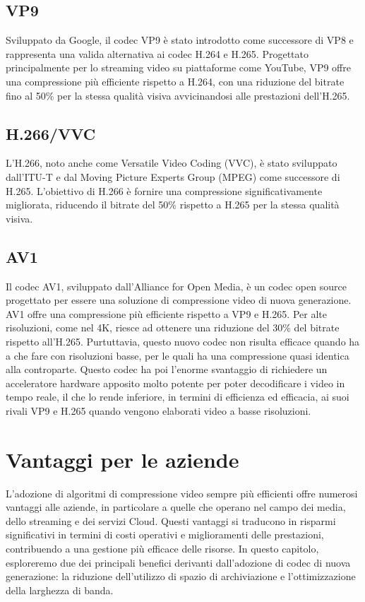 \documentclass[a4paper,12pt, oneside]{article}
\begin{document}
\subsection{VP9}
Sviluppato da Google, il codec VP9 è stato introdotto come successore di VP8 e rappresenta una valida
alternativa ai codec H.264 e H.265. Progettato principalmente per lo streaming video su piattaforme come
YouTube, VP9 offre una compressione più efficiente rispetto a H.264, con una riduzione del bitrate fino al
50\% per la stessa qualità visiva avvicinandosi alle prestazioni dell'H.265.

\subsection{H.266/VVC}
L'H.266, noto anche come Versatile Video Coding (VVC), è stato sviluppato dall'ITU-T e dal Moving Picture
Experts Group (MPEG) come successore di H.265. L'obiettivo di H.266 è fornire una compressione
significativamente migliorata, riducendo il bitrate del 50\% rispetto a H.265 per la stessa qualità visiva.

\subsection{AV1}
Il codec AV1, sviluppato dall'Alliance for Open Media, è un codec open source progettato per essere una
soluzione di compressione video di nuova generazione. AV1 offre una compressione più efficiente rispetto
a VP9 e H.265. Per alte risoluzioni, come nel 4K, riesce ad ottenere una riduzione del 30\% del bitrate
rispetto all'H.265. Purtuttavia, questo nuovo codec non risulta efficace  quando ha a che fare con risoluzioni basse, per le quali ha una compressione quasi identica
alla controparte. Questo codec ha poi l'enorme svantaggio di richiedere un acceleratore hardware apposito
molto potente per poter decodificare i video in tempo reale, il che lo rende inferiore, in termini di efficienza ed efficacia, ai suoi rivali VP9
e H.265 quando vengono elaborati video a basse risoluzioni.

\section{Vantaggi per le aziende}
L'adozione di algoritmi di compressione video sempre più efficienti offre numerosi vantaggi alle aziende,
in particolare a quelle che operano nel campo dei media, dello streaming e dei servizi Cloud. Questi
vantaggi si traducono in risparmi significativi in termini di costi operativi e miglioramenti delle
prestazioni, contribuendo a una gestione più efficace delle risorse. In questo capitolo, esploreremo due
dei principali benefici derivanti dall'adozione di codec di nuova generazione: la riduzione dell'utilizzo
di spazio di archiviazione e l'ottimizzazione della larghezza di banda.
\end{document}
